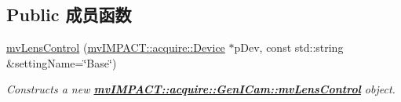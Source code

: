 \subsection*{Public 成员函数}
\begin{DoxyCompactItemize}
\item 
\hyperlink{classmv_i_m_p_a_c_t_1_1acquire_1_1_gen_i_cam_1_1mv_lens_control_a3a0edfeb5e8b583cb69f12ee85db2e76}{mv\+Lens\+Control} (\hyperlink{classmv_i_m_p_a_c_t_1_1acquire_1_1_device}{mv\+I\+M\+P\+A\+C\+T\+::acquire\+::\+Device} $\ast$p\+Dev, const std\+::string \&setting\+Name=\char`\"{}Base\char`\"{})
\begin{DoxyCompactList}\small\item\em Constructs a new {\bfseries \hyperlink{classmv_i_m_p_a_c_t_1_1acquire_1_1_gen_i_cam_1_1mv_lens_control}{mv\+I\+M\+P\+A\+C\+T\+::acquire\+::\+Gen\+I\+Cam\+::mv\+Lens\+Control}} object. \end{DoxyCompactList}\end{DoxyCompactItemize}
